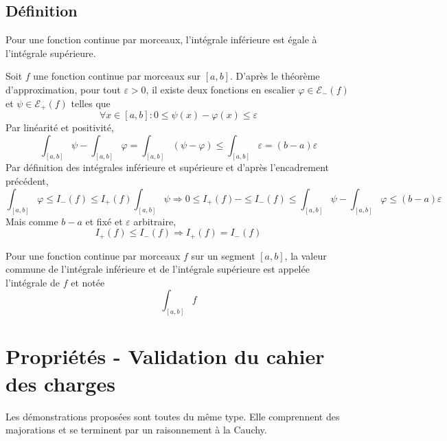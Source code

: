 \subsection{Définition}
\begin{propn}
Pour une fonction continue par morceaux, l'intégrale inférieure est égale à l'intégrale supérieure. 
\end{propn}
\begin{demo}
 Soit $f$ une fonction continue par morceaux sur $[a,b]$. D'après le théorème d'approximation, pour tout $\varepsilon >0$, il existe deux fonctions en escalier $\varphi\in \mathcal E_-(f)$ et $\psi\in \mathcal E_+(f)$ telles que
\begin{displaymath}
 \forall x \in [a,b] : 
 0 \leq \psi(x) - \varphi(x) \leq \varepsilon
\end{displaymath}
Par linéarité et positivité,
\begin{displaymath}
 \int_{[a,b]}\psi - \int_{[a,b]}\varphi = \int_{[a,b]}(\psi - \varphi) \leq \int_{[a,b]}\varepsilon = (b-a)\varepsilon
\end{displaymath}
Par définition des intégrales inférieure et supérieure et d'après l'encadrement précédent,
\begin{displaymath}
 \int_{[a,b]}\varphi \leq I_-(f) \leq I_+(f) \int_{[a,b]}\psi \Rightarrow
0 \leq I_+(f) - \leq I_-(f) \leq \int_{[a,b]}\psi - \int_{[a,b]}\varphi \leq (b-a)\varepsilon
\end{displaymath}
Mais comme $b-a$ et fixé et $\varepsilon$ arbitraire,
\begin{displaymath}
I_+(f) \leq I_-(f) \Rightarrow  I_+(f) = I_-(f)
\end{displaymath}
\end{demo}
\begin{defi}
Pour une fonction continue par morceaux $f$ sur un segment $[a,b]$, la valeur commune de l'intégrale inférieure et de l'intégrale supérieure est appelée l'intégrale de $f$ et notée
\begin{displaymath}
 \int_{[a,b]}f
\end{displaymath}
\end{defi}

\section{Propriétés - Validation du cahier des charges}
Les démonstrations proposées sont toutes du même type. Elle comprennent des majorations et se terminent par un raisonnement à la Cauchy.
